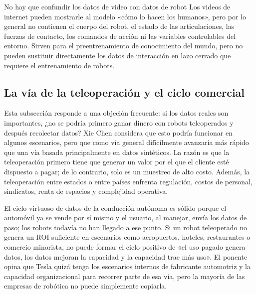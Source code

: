 \begin{warningbox}{No hay que confundir los datos de video con datos de robot}
Los videos de internet pueden mostrarle al modelo «cómo lo hacen los humanos», pero por lo general no contienen el cuerpo del robot, el estado de las articulaciones, las fuerzas de contacto, los comandos de acción ni las variables controlables del entorno. Sirven para el preentrenamiento de conocimiento del mundo, pero no pueden sustituir directamente los datos de interacción en lazo cerrado que requiere el entrenamiento de robots.
\end{warningbox}

\subsection{La vía de la teleoperación y el ciclo comercial}

Esta subsección responde a una objeción frecuente: si los datos reales son importantes, ¿no se podría primero ganar dinero con robots teleoperados y después recolectar datos? Xie Chen considera que esto podría funcionar en algunos escenarios, pero que como vía general difícilmente avanzaría más rápido que una vía basada principalmente en datos sintéticos. La razón es que la teleoperación primero tiene que generar un valor por el que el cliente esté dispuesto a pagar; de lo contrario, solo es un muestreo de alto costo. Además, la teleoperación entre estados o entre países enfrenta regulación, costos de personal, sindicatos, renta de espacios y complejidad operativa.

El ciclo virtuoso de datos de la conducción autónoma es sólido porque el automóvil ya se vende por sí mismo y el usuario, al manejar, envía los datos de paso; los robots todavía no han llegado a ese punto. Si un robot teleoperado no genera un ROI suficiente en escenarios como aeropuertos, hoteles, restaurantes o comercio minorista, no puede formar el ciclo positivo de «el uso pagado genera datos, los datos mejoran la capacidad y la capacidad trae más uso». El ponente opina que Tesla quizá tenga los escenarios internos de fabricante automotriz y la capacidad organizacional para recorrer parte de esa vía, pero la mayoría de las empresas de robótica no puede simplemente copiarla.

